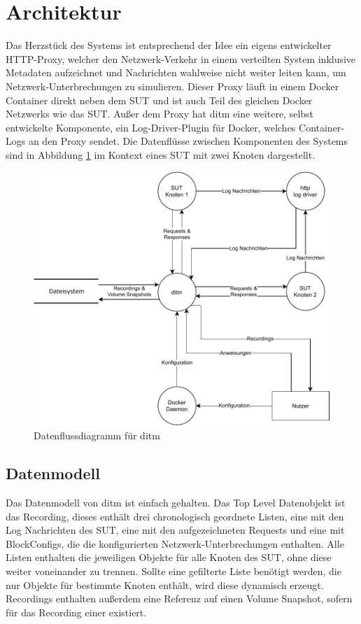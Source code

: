 \documentclass[12pt,a4paper]{report}
\begin{document}
\section{Architektur}
Das Herzstück des Systems ist entsprechend der Idee ein eigens entwickelter HTTP-Proxy, welcher den Netzwerk-Verkehr in einem
verteilten System inklusive Metadaten aufzeichnet und Nachrichten wahlweise nicht weiter leiten kann, um Netzwerk-Unterbrechungen
zu simulieren. Dieser Proxy läuft in einem Docker Container direkt neben dem SUT und ist auch Teil des gleichen Docker Netzwerks
wie das SUT. Außer dem Proxy hat ditm eine weitere, selbst entwickelte Komponente, ein Log-Driver-Plugin für Docker, welches
Container-Logs an den Proxy sendet. Die Datenflüsse zwischen Komponenten des Systems sind in Abbildung \ref{fig:dataflow} im
Kontext eines SUT mit zwei Knoten dargestellt.
\begin{figure}[H]
	\centering
	\includegraphics[width=\linewidth]{img/ditm-Dataflow.pdf}
	\caption{Datenflussdiagramm für ditm}
	\label{fig:dataflow}
\end{figure}

\subsection{Datenmodell}
Das Datenmodell von ditm ist einfach gehalten. Das Top Level Datenobjekt ist das Recording, dieses enthält drei chronologisch
geordnete Listen, eine mit den Log Nachrichten des SUT, eine mit den aufgezeichneten Requests und eine mit BlockConfigs, die die
konfigurierten Netzwerk-Unterbrechungen enthalten. Alle Listen enthalten die jeweiligen Objekte für alle Knoten des SUT, ohne
diese weiter voneinander zu trennen. Sollte eine gefilterte Liste benötigt werden, die nur Objekte für bestimmte Knoten enthält,
wird diese dynamisch erzeugt. Recordings enthalten außerdem eine Referenz auf einen Volume Snapshot, sofern für das Recording
einer existiert.
\end{document}
